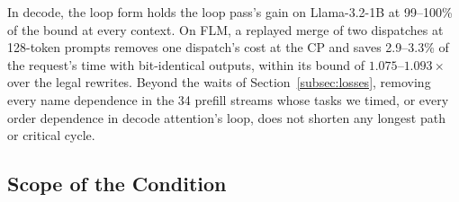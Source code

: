 In decode, the loop form holds the loop pass's gain on Llama-3.2-1B at 99--100\% of the bound at every context.
On FLM, a replayed merge of two dispatches at 128-token prompts removes one dispatch's cost at the CP and saves 2.9--3.3\% of the request's time with bit-identical outputs, within its bound of $1.075$--$1.093\times$ over the legal rewrites.
Beyond the waits of Section~\ref{subsec:losses}, removing every name dependence in the 34 prefill streams whose tasks we timed, or every order dependence in decode attention's loop, does not shorten any longest path or critical cycle.

\subsection{Scope of the Condition}
\label{subsec:pays}
\label{subsec:clause}

